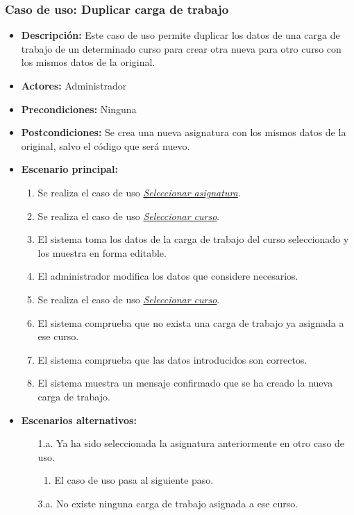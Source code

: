\documentclass{book}
\begin{document}
\subsubsection*{Caso de uso: Duplicar carga de trabajo}
\label{duplicar_carga}
\begin{itemize}
\item{\bf Descripción:} Este caso de uso permite duplicar los datos de una carga de trabajo de un determinado curso para crear otra nueva para otro curso con los mismos datos de la original.
\item{\bf Actores:} Administrador
\item{\bf Precondiciones:} Ninguna
\item{\bf Postcondiciones:} Se crea una nueva asignatura con los mismos datos de la original, salvo el código que será nuevo.
\item{\bf Escenario principal:}
	\begin{enumerate}
	\item Se realiza el caso de uso {\em \hyperref[select_asignatura]{Seleccionar asignatura}}.
	\item Se realiza el caso de uso {\em \hyperref[select_curso]{Seleccionar curso}}.
	\item El sistema toma los datos de la carga de trabajo del curso seleccionado y los muestra en forma editable.
	\item El administrador modifica los datos que considere necesarios.
	\item Se realiza el caso de uso {\em \hyperref[select_curso]{Seleccionar curso}}.
	\item El sistema comprueba que no exista una carga de trabajo ya asignada a ese curso.
	\item El sistema comprueba que las datos introducidos son correctos.
	\item El sistema muestra un mensaje confirmado que se ha creado la nueva carga de trabajo.
	\end{enumerate}
\item{\bf Escenarios alternativos:}
	\begin{itemize}
	\item[1.a.] Ya ha sido seleccionada la asignatura anteriormente en otro caso de uso.
		\begin{enumerate}
		\item El caso de uso pasa al siguiente paso.
		\end{enumerate}
	\item[3.a.] No existe ninguna carga de trabajo asignada a ese curso.

\end{itemize}
\end{itemize}
\end{document}
